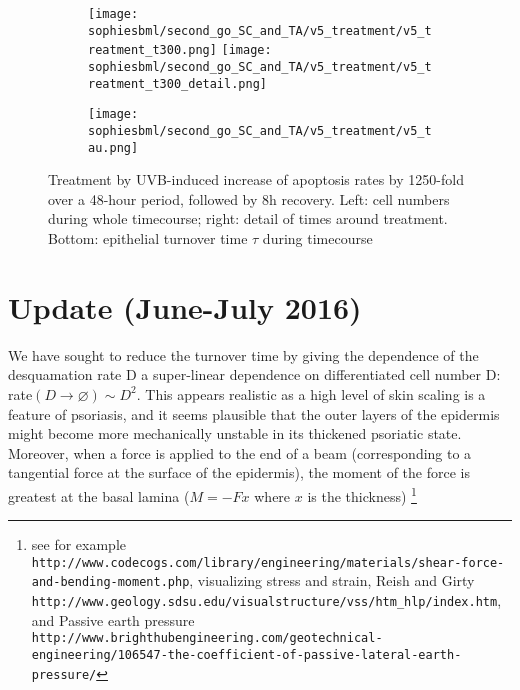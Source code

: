 \documentclass[a4paper,10pt]{report}
\newcommand{\psortbase}{/home/ngrs2/work/bsu/PSORT_Zuliani_Reynolds/}
\newcommand{\sbmlbase}{\psortbase/sbml-sh/}
\newcommand{\sophiesbml}{\sbmlbase/sophie_like}
\begin{document}
\begin{figure}[h!]
  \begin{subfigure}{\textwidth}
    \texttt{[image: \\sophiesbml/second\_go\_SC\_and\_TA/v5\_treatment/v5\_treatment\_t300.png]}
    \texttt{[image: \\sophiesbml/second\_go\_SC\_and\_TA/v5\_treatment/v5\_treatment\_t300\_detail.png]}
  \end{subfigure}
  \begin{subfigure}{\textwidth}
    \texttt{[image: \\sophiesbml/second\_go\_SC\_and\_TA/v5\_treatment/v5\_tau.png]}
  \end{subfigure}
  \caption{Treatment by UVB-induced increase of apoptosis rates by 1250-fold over a 48-hour period, followed by 8h recovery. Left: cell numbers during whole timecourse; right: detail of times around treatment. Bottom: epithelial turnover time $\tau$ during timecourse}
  \label{fig:secondsophie_treatment}
\end{figure}




\section{Update (June-July 2016)}\label{sec:SWjun16}


We have sought to reduce the turnover time by giving the dependence of the desquamation rate D a super-linear dependence on differentiated cell number D:
 rate$(D\rightarrow\varnothing) \sim D^2$.  
This appears realistic as a high level of skin scaling is a feature of psoriasis, and it seems plausible that the outer layers of the epidermis might become more mechanically unstable in its thickened psoriatic state. Moreover, when a force is applied to the end of a beam (corresponding to a tangential force at the surface of the epidermis), the moment of the force is greatest at the basal lamina ($M = -F x$ where $x$ is the thickness) 
\footnote{see for example {\tt http://www.codecogs.com/library/engineering/materials/shear-force-and-bending-moment.php}, visualizing stress and strain, Reish and Girty {\tt http://www.geology.sdsu.edu/visualstructure/vss/htm\_hlp/index.htm}, and Passive earth pressure {\tt http://www.brighthubengineering.com/geotechnical-engineering/106547-the-coefficient-of-passive-lateral-earth-pressure/}}
\end{document}

